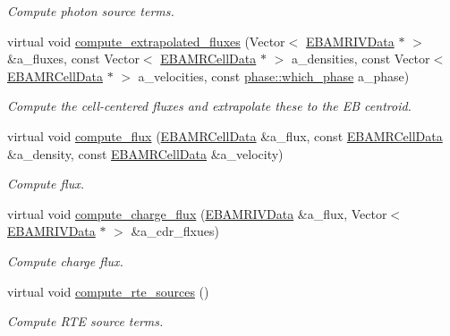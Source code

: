 \begin{DoxyCompactItemize}
\begin{DoxyCompactList}\small\item\em Compute photon source terms. \end{DoxyCompactList}\item 
virtual void \hyperlink{classtime__stepper_a96dd4c1d811d24f74a11b6b704d0d9d9}{compute\+\_\+extrapolated\+\_\+fluxes} (Vector$<$ \hyperlink{type__definitions_8H_a6b8fa905d55cbb491b52180386f0e0c1}{E\+B\+A\+M\+R\+I\+V\+Data} $\ast$ $>$ \&a\+\_\+fluxes, const Vector$<$ \hyperlink{type__definitions_8H_a7e610f301989e5e07781c5e338bdb7c3}{E\+B\+A\+M\+R\+Cell\+Data} $\ast$ $>$ a\+\_\+densities, const Vector$<$ \hyperlink{type__definitions_8H_a7e610f301989e5e07781c5e338bdb7c3}{E\+B\+A\+M\+R\+Cell\+Data} $\ast$ $>$ a\+\_\+velocities, const \hyperlink{namespacephase_a23c76f548a5eb1955ed8c929c541108b}{phase\+::which\+\_\+phase} a\+\_\+phase)
\begin{DoxyCompactList}\small\item\em Compute the cell-\/centered fluxes and extrapolate these to the EB centroid. \end{DoxyCompactList}\item 
virtual void \hyperlink{classtime__stepper_af8ed4d64d7d8b2d927de176fbb9a1774}{compute\+\_\+flux} (\hyperlink{type__definitions_8H_a7e610f301989e5e07781c5e338bdb7c3}{E\+B\+A\+M\+R\+Cell\+Data} \&a\+\_\+flux, const \hyperlink{type__definitions_8H_a7e610f301989e5e07781c5e338bdb7c3}{E\+B\+A\+M\+R\+Cell\+Data} \&a\+\_\+density, const \hyperlink{type__definitions_8H_a7e610f301989e5e07781c5e338bdb7c3}{E\+B\+A\+M\+R\+Cell\+Data} \&a\+\_\+velocity)
\begin{DoxyCompactList}\small\item\em Compute flux. \end{DoxyCompactList}\item 
virtual void \hyperlink{classtime__stepper_a3eb72bb3d6615fcb2ad255eb5518b082}{compute\+\_\+charge\+\_\+flux} (\hyperlink{type__definitions_8H_a6b8fa905d55cbb491b52180386f0e0c1}{E\+B\+A\+M\+R\+I\+V\+Data} \&a\+\_\+flux, Vector$<$ \hyperlink{type__definitions_8H_a6b8fa905d55cbb491b52180386f0e0c1}{E\+B\+A\+M\+R\+I\+V\+Data} $\ast$ $>$ \&a\+\_\+cdr\+\_\+flxues)
\begin{DoxyCompactList}\small\item\em Compute charge flux. \end{DoxyCompactList}\item 
virtual void \hyperlink{classtime__stepper_ac587da897b0dc5a165d22eb6c0cb528d}{compute\+\_\+rte\+\_\+sources} ()
\begin{DoxyCompactList}\small\item\em Compute R\+TE source terms. \end{DoxyCompactList}\item 

\end{DoxyCompactItemize}
